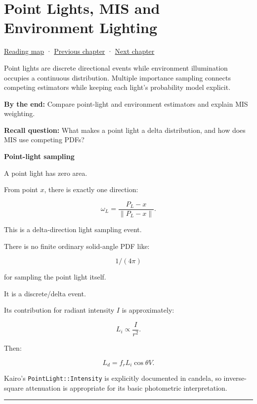 \chapter{Point Lights, MIS and Environment Lighting}\label{03-visual-computing-i-ch009-point-lights-mis-and-environment-lighting}\hypertarget{03-visual-computing-i-ch009}{}\label{stagechapter:03-visual-computing-i-ch009}

\hyperref[volume-reading-map]{Reading map} · \hyperref[03-visual-computing-i-ch008-sampling-directions-and-light-transport]{Previous chapter} · \hyperref[03-visual-computing-i-ch010-a-production-path-tracer-media-randomness-and-validation]{Next chapter}

Point lights are discrete directional events while environment illumination occupies a continuous distribution. Multiple importance sampling connects competing estimators while keeping each light's probability model explicit.

\textbf{By the end:} Compare point-light and environment estimators and explain MIS weighting.

\textbf{Recall question:} What makes a point light a delta distribution, and how does MIS use competing PDFs?

\textbf{Point-light sampling}

A point light has zero area.

From point \(x\), there is exactly one direction:

\[
\omega_L
=
\frac{
P_L-x
}{
\|P_L-x\|
}.
\]

This is a delta-direction light sampling event.

There is no finite ordinary solid-angle PDF like:

\[
1/(4\pi)
\]

for sampling the point light itself.

It is a discrete/delta event.

Its contribution for radiant intensity \(I\) is approximately:

\[
L_i
\propto
\frac{
I
}{
r^2
}.
\]

Then:

\[
L_d
=
f_r
L_i
\cos\theta
V.
\]

Kairo's \texttt{PointLight::Intensity} is explicitly documented in candela, so inverse-square attenuation is appropriate for its basic photometric interpretation.

\begin{center}\rule{0.5\linewidth}{0.5pt}\end{center}

